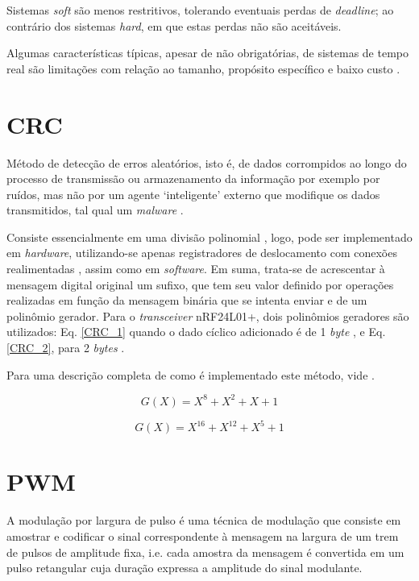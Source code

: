 Sistemas \textit{soft} são menos restritivos, tolerando eventuais perdas de \textit{deadline}; 
ao contrário dos sistemas \textit{hard}, em que estas perdas não são aceitáveis.  

Algumas características típicas, apesar de não obrigatórias, de sistemas de tempo real são limitações com relação ao tamanho, propósito específico e 
baixo custo \cite{silberschatz}.

\section{CRC}
Método de detecção de erros aleatórios, isto é, de dados corrompidos ao longo do processo de transmissão ou armazenamento da informação por exemplo 
por ruídos, mas não por um agente \textquoteleft inteligente\textquoteright{} externo que modifique os dados transmitidos, tal qual um 
\textit{malware} \cite{stigge}.

Consiste essencialmente em uma divisão polinomial \cite{stigge}, logo, pode ser implementado em \textit{hardware}, utilizando-se apenas registradores 
de deslocamento com conexões realimentadas \cite{peterson}, assim como em \textit{software}. 
Em suma, trata-se de acrescentar à mensagem digital original um sufixo, que tem seu valor definido por operações realizadas em função da mensagem 
binária que se intenta enviar e de um polinômio gerador.
Para o \textit{transceiver} nRF24L01+, dois polinômios geradores são utilizados: Eq. \ref{CRC_1} quando o dado cíclico adicionado é de 1 
\textit{byte} , e Eq. \ref{CRC_2}, para 2 \textit{bytes} \cite{nRF}.

Para uma descrição completa de como é implementado este método, vide \cite{stigge,peterson}.

\begin{equation}
\label{CRC_1}
G(X) = X^8 + X^2 + X + 1 
\end{equation}

\begin{equation}
\label{CRC_2}
G(X) = X^{16} + X^{12} + X^5 + 1 
\end{equation}

\section{PWM}
A modulação por largura de pulso é uma técnica de modulação que consiste em amostrar e codificar o sinal correspondente à mensagem na largura de um 
trem de pulsos de amplitude fixa, i.e. cada amostra da mensagem é convertida em um pulso retangular cuja duração expressa a amplitude do sinal 
modulante.

